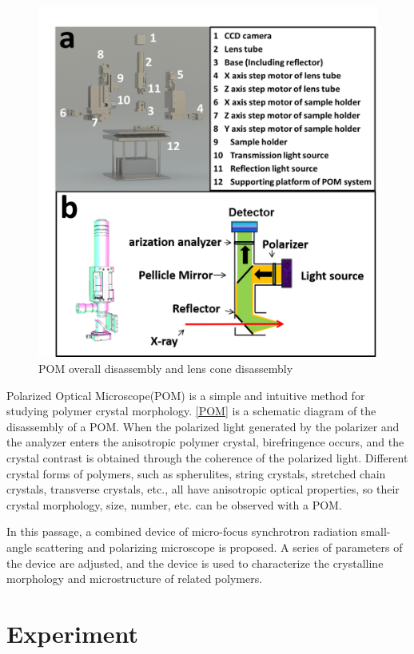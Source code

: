 \documentclass{Head}
\begin{document}
\begin{figure}
    \centering
    \includegraphics[scale=0.5]{Figures/Fig3POM.png}
    \caption{POM overall disassembly and lens cone disassembly}
    \label{POM}
\end{figure}
Polarized Optical Microscope(POM) is a simple and intuitive method for studying polymer crystal morphology.
\autoref{POM} is a schematic diagram of the disassembly of a POM.
When the polarized light generated by the polarizer and the analyzer enters the anisotropic polymer crystal, birefringence occurs, and the crystal contrast is obtained through the coherence of the polarized light.
Different crystal forms of polymers, such as spherulites, string crystals, stretched chain crystals, transverse crystals, etc., all have anisotropic optical properties, so their crystal morphology, size, number, etc. can be observed with a POM.


In this passage, a combined device of micro-focus synchrotron radiation small-angle scattering and polarizing microscope is proposed.
A series of parameters of the device are adjusted, and the device is used to characterize the crystalline morphology and microstructure of related polymers.
\section{Experiment}
\end{document}
